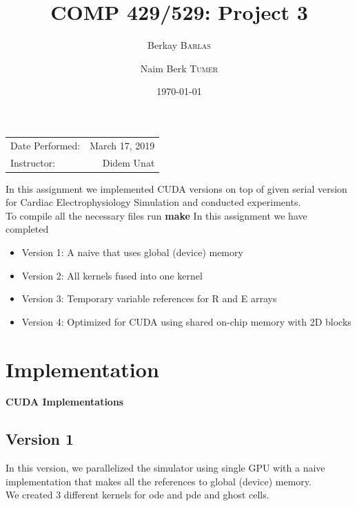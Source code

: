 \documentclass{article}
\title{COMP 429/529: Project 3} %
\author{
  Berkay \textsc{Barlas}
  \and
  Naim Berk \textsc{Tumer}
}
\date{\today} %
\newcommand\tab[1][0.5cm]{\hspace*{#1}}
\begin{document}
\maketitle %

\begin{center}
\begin{tabular}{l r}
Date Performed: & March 17, 2019 \\ %
Instructor: & Didem Unat %
\end{tabular}
\end{center}



\tab In this assignment we implemented CUDA versions
on top of given serial version for Cardiac Electrophysiology Simulation and conducted experiments. 
\\ \tab  To compile all the necessary files run \textbf{make}
\newline
In this assignment we have completed
\begin{itemize}
    \item Version 1: A naive that uses global (device) memory
    \item Version 2: All kernels fused into one kernel
    \item Version 3: Temporary variable references for R and E arrays 
    \item Version 4: Optimized for CUDA using shared on-chip memory with 2D blocks 
\end{itemize}

\section{Implementation}
\textbf{CUDA Implementations}

\subsection{Version 1}
\tab In this version, we parallelized the simulator using single GPU with a naive implementation that makes all the references to global (device) memory. 
\\ We created 3 different kernels for ode and pde and ghost cells.
\end{document}
